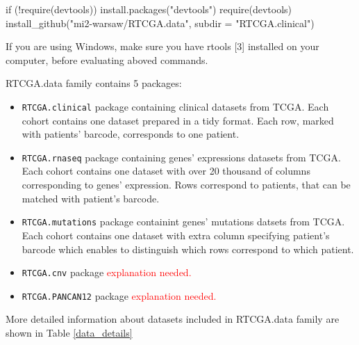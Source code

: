 \begin{Schunk}
\begin{Sinput}
if (!require(devtools)) {
    install.packages("devtools")
    require(devtools)
}
install_github("mi2-warsaw/RTCGA.data", 
                subdir = "RTCGA.clinical") 
\end{Sinput}
\end{Schunk}

If you are using Windows, make sure you have rtools {[}3{]} installed on
your computer, before evaluating aboved commands.

RTCGA.data family contains 5 packages:

\begin{itemize}
\itemsep1pt\parskip0pt
\item
  \texttt{RTCGA.clinical} package containing clinical datasets from
  TCGA. Each cohort contains one dataset prepared in a tidy format. Each
  row, marked with patients' barcode, corresponds to one patient.
\item
  \texttt{RTCGA.rnaseq} package containing genes' expressions datasets
  from TCGA. Each cohort contains one dataset with over 20 thousand of
  columns corresponding to genes' expression. Rows correspond to
  patients, that can be matched with patient's barcode.
\item
  \texttt{RTCGA.mutations} package containint genes' mutations datsets
  from TCGA. Each cohort contains one dataset with extra column
  specifying patient's barcode which enables to distinguish which rows
  correspond to which patient.
\item
  \texttt{RTCGA.cnv} package \textcolor{red}{ explanation needed.}
\item
  \texttt{RTCGA.PANCAN12} package \textcolor{red}{ explanation needed.}
\end{itemize}

More detailed information about datasets included in RTCGA.data family
are shown in Table \ref{data_details}

\tiny

